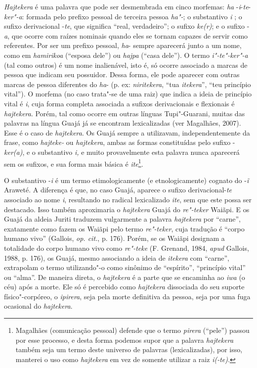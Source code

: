 \emph{Hajtekera} é uma palavra que pode ser desmembrada em cinco
morfemas: \emph{ha} -\emph{i}-\emph{te}-\emph{ker"-a}: formada pelo
prefixo pessoal de terceira pessoa \emph{ha"-}; o substantivo \emph{i} ;
o sufixo derivacional -\emph{te}, que significa ``real, verdadeiro''; o
sufixo \emph{ke(r)}; e o sufixo -\emph{a}, que ocorre com raízes
nominais quando eles se tornam capazes de servir como referentes. Por
ser um prefixo pessoal, \emph{ha}- sempre aparecerá junto a um nome,
como em \emph{hamirikoa} (``esposa dele'') ou \emph{hajpa} (``casa dele'').
O termo \emph{i"-te"-ker"-a} (tal como outros) é um nome inalienável, isto
é, só ocorre associado a marcas de pessoa que indicam seu possuidor.
Dessa forma, ele pode aparecer com outras marcas de pessoa diferentes do
\emph{ha}- (p. ex: \emph{niritekera}, ``tua \emph{itekera}'', ``teu
princípio vital''). O morfema (no caso trata"-se de uma raiz) que indica a
ideia de princípio vital é \emph{i}, cuja forma completa associada a
sufixos derivacionais e flexionais é \emph{hajtekera}. Porém, tal como
ocorre em outras línguas Tupi"-Guarani, muitas das palavras na língua
Guajá já se encontram lexicalizadas (ver Magalhães, 2007). Esse é o caso
de \emph{hajtekera}. Os Guajá sempre a utilizavam, independentemente da
frase, como \emph{hajteke-} ou \emph{hajtekera}, ambas as formas
constituídas pelo sufixo -\emph{ker(a)}, e o substantivo \emph{i,} e
muito provavelmente esta palavra nunca aparecerá sem os sufixos, e sua
forma mais básica é \emph{ite}\footnote{Magalhães (comunicação pessoal)
  defende que o termo \emph{pirera} (``pele'') passou por esse processo, e
  desta forma podemos supor que a palavra \emph{hajtekera} também seja
  um termo deste universo de palavras (lexicalizadas), por isso,
  manterei o uso como \emph{hajtekera} em vez de somente utilizar a raiz
  \emph{i(-te)}.}.

O substantivo -\emph{i} é um termo etimologicamente (e etnologicamente)
cognato do -\emph{ĩ} Araweté. A diferença é que, no caso Guajá, aparece
o sufixo derivacional-\emph{te} associado ao nome \emph{i}, resultando
no radical lexicalizado \emph{ite}, sem que este possa ser destacado.
Isso também aproximaria o \emph{hajtekera} Guajá do \emph{re"-teker}
Waiãpi. E os Guajá da aldeia Juriti traduzem vulgarmente a palavra
\emph{hajtekera} por ``carne'', exatamente como fazem os Waiãpi pelo termo
\emph{re"-teker}, cuja tradução é ``corpo humano vivo'' (Gallois, \emph{op. cit.},
p. 176). Porém, se os Waiãpi designam a totalidade do corpo humano vivo
como \emph{re"-teke} (F. Grenand, 1984, \emph{apud} Gallois, 1988, p. 176), os
Guajá, mesmo associando a ideia de \emph{itekera} com ``carne'',
extrapolam o termo utilizando"-o como sinônimo de ``espírito'', ``princípio
vital'' ou ``alma''. De maneira direta, o \emph{hajtekera} é a parte que se
encaminha ao \emph{iwa} (o céu) após a morte. Ele só é percebido como
\emph{hajtekera} dissociada do seu suporte físico"-corpóreo, o
\emph{ipirera}, seja pela morte definitiva da pessoa, seja por uma fuga
ocasional do \emph{hajtekera}.

